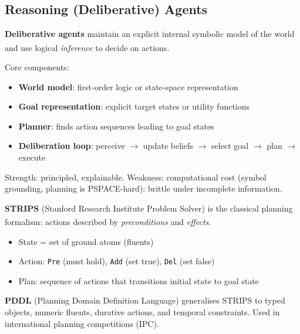 \subsection{Reasoning (Deliberative) Agents}
\begin{tcbitemize}[ skin=sectionraster ]

    \tcbitem[title=Symbolic Reasoning Agents, raster multicolumn=3]
    \textbf{Deliberative agents} maintain an explicit internal symbolic model
    of the world and use logical \emph{inference} to decide on
    actions.\textsuperscript{\cite[][p.~58]{wooldridgeIntroductionMultiAgentSystems2009}}

    Core components:
    \begin{itemize}
        \item \textbf{World model}: first-order logic or state-space representation
        \item \textbf{Goal representation}: explicit target states or utility functions
        \item \textbf{Planner}: finds action sequences leading to goal states
        \item \textbf{Deliberation loop}: perceive $\to$ update beliefs $\to$ select goal $\to$ plan $\to$ execute
    \end{itemize}
    Strength: principled, explainable.
    Weakness: computational cost (symbol grounding, planning is PSPACE-hard); brittle under incomplete information.

    \tcbitem[title={Planning: STRIPS \& PDDL}, raster multicolumn=3]
    \textbf{STRIPS} (Stanford Research Institute Problem Solver) is the classical
    planning formalism: actions described by \emph{preconditions} and
    \emph{effects}.\textsuperscript{\cite[][p.~62]{wooldridgeIntroductionMultiAgentSystems2009}}

    \begin{itemize}
        \item State = set of ground atoms (fluents)
        \item Action: \texttt{Pre} (must hold), \texttt{Add} (set true), \texttt{Del} (set false)
        \item Plan: sequence of actions that transitions initial state to goal state
    \end{itemize}
    \textbf{PDDL} (Planning Domain Definition Language) generalises STRIPS to
    typed objects, numeric fluents, durative actions, and temporal constraints.
    Used in international planning competitions (IPC).

\end{tcbitemize}

